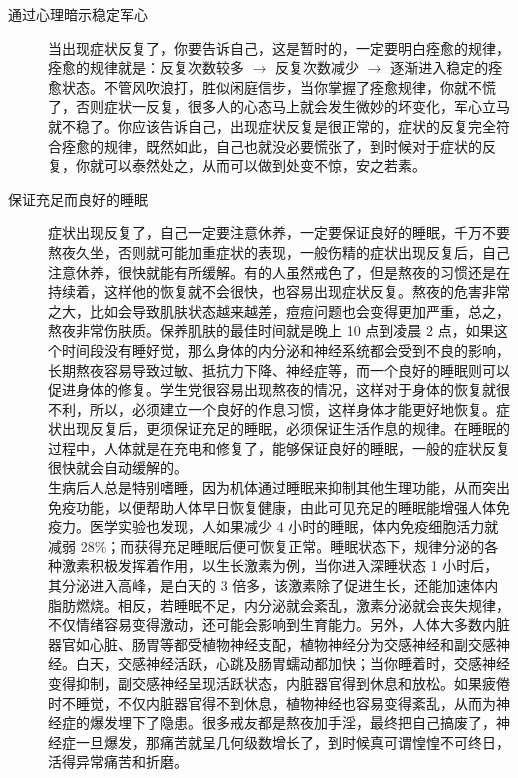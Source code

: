 \documentclass[fontset=founder]{ctexart}
\begin{document}
\begin{description}
    \item[通过心理暗示稳定军心] 当出现症状反复了，你要告诉自己，这是暂时的，一定要明白痊愈的规律，痊愈的规律就是：反复次数较多 $\to$ 反复次数减少 $\to$ 逐渐进入稳定的痊愈状态。不管风吹浪打，胜似闲庭信步，当你掌握了痊愈规律，你就不慌了，否则症状一反复，很多人的心态马上就会发生微妙的坏变化，军心立马就不稳了。你应该告诉自己，出现症状反复是很正常的，症状的反复完全符合痊愈的规律，既然如此，自己也就没必要慌张了，到时候对于症状的反复，你就可以泰然处之，从而可以做到处变不惊，安之若素。
    \item[保证充足而良好的睡眠] 症状出现反复了，自己一定要注意休养，一定要保证良好的睡眠，千万不要熬夜久坐，否则就可能加重症状的表现，一般伤精的症状出现反复后，自己注意休养，很快就能有所缓解。有的人虽然戒色了，但是熬夜的习惯还是在持续着，这样他的恢复就不会很快，也容易出现症状反复。熬夜的危害非常之大，比如会导致肌肤状态越来越差，痘痘问题也会变得更加严重，总之，熬夜非常伤肤质。保养肌肤的最佳时间就是晚上 10 点到凌晨 2 点，如果这个时间段没有睡好觉，那么身体的内分泌和神经系统都会受到不良的影响，长期熬夜容易导致过敏、抵抗力下降、神经症等，而一个良好的睡眠则可以促进身体的修复。学生党很容易出现熬夜的情况，这样对于身体的恢复就很不利，所以，必须建立一个良好的作息习惯，这样身体才能更好地恢复。症状出现反复后，更须保证充足的睡眠，必须保证生活作息的规律。在睡眠的过程中，人体就是在充电和修复了，能够保证良好的睡眠，一般的症状反复很快就会自动缓解的。\\ 生病后人总是特别嗜睡，因为机体通过睡眠来抑制其他生理功能，从而突出免疫功能，以便帮助人体早日恢复健康，由此可见充足的睡眠能增强人体免疫力。医学实验也发现，人如果减少 4 小时的睡眠，体内免疫细胞活力就减弱 28\%；而获得充足睡眠后便可恢复正常。睡眠状态下，规律分泌的各种激素积极发挥着作用，以生长激素为例，当你进入深睡状态 1 小时后，其分泌进入高峰，是白天的 3 倍多，该激素除了促进生长，还能加速体内脂肪燃烧。相反，若睡眠不足，内分泌就会紊乱，激素分泌就会丧失规律，不仅情绪容易变得激动，还可能会影响到生育能力。另外，人体大多数内脏器官如心脏、肠胃等都受植物神经支配，植物神经分为交感神经和副交感神经。白天，交感神经活跃，心跳及肠胃蠕动都加快；当你睡着时，交感神经变得抑制，副交感神经呈现活跃状态，内脏器官得到休息和放松。如果疲倦时不睡觉，不仅内脏器官得不到休息，植物神经也容易变得紊乱，从而为神经症的爆发埋下了隐患。很多戒友都是熬夜加手淫，最终把自己搞废了，神经症一旦爆发，那痛苦就呈几何级数增长了，到时候真可谓惶惶不可终日，活得异常痛苦和折磨。

\end{description}
\end{document}
